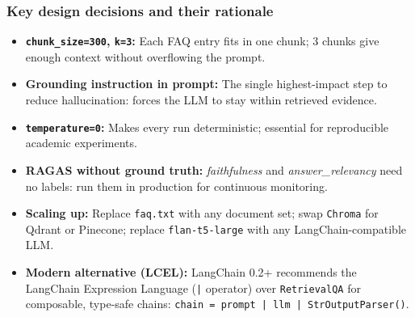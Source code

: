 \begin{frame}[fragile]\frametitle{Key design decisions and their rationale}

\begin{itemize}
  \item \textbf{\texttt{chunk\_size=300}, \texttt{k=3}:} Each FAQ entry fits in one chunk; 3 chunks give enough context without overflowing the prompt.
  \item \textbf{Grounding instruction in prompt:} The single highest-impact step to reduce hallucination: forces the LLM to stay within retrieved evidence.
  \item \textbf{\texttt{temperature=0}:} Makes every run deterministic; essential for reproducible academic experiments.
  \item \textbf{RAGAS without ground truth:} \textit{faithfulness} and \textit{answer\_relevancy} need no labels: run them in production for continuous monitoring.
  \item \textbf{Scaling up:} Replace \texttt{faq.txt} with any document set; swap \texttt{Chroma} for Qdrant or Pinecone; replace \texttt{flan-t5-large} with any LangChain-compatible LLM.
  \item \textbf{Modern alternative (LCEL):} LangChain 0.2+ recommends the LangChain Expression Language (\texttt{|} operator) over \texttt{RetrievalQA} for composable, type-safe chains: \texttt{chain = prompt | llm | StrOutputParser()}.
\end{itemize}

\end{frame}



